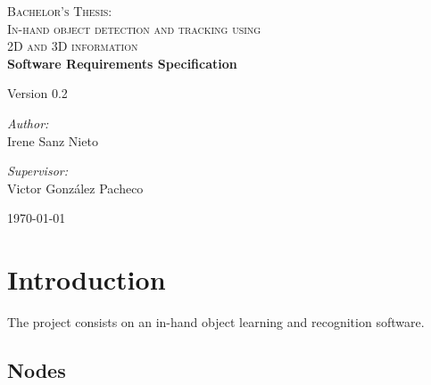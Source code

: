 \documentclass{article}
\begin{document}
\begin{titlepage}

\begin{center}
\textsc{\huge Bachelor's Thesis:\\[0.5cm]In-hand object detection and tracking using\\[0.5cm]2D and 3D
information }\\[4cm]


{\Huge\bfseries{Software Requirements Specification}\\[2cm]}

\Large{Version 0.2}
\\[11cm]


\begin{minipage}{0.55\textwidth}
\begin{flushleft} \large
\emph{Author:}\\
Irene Sanz Nieto\\
\end{flushleft}
\end{minipage}
\begin{minipage}{0.4\textwidth}
\begin{flushright} \large
\emph{Supervisor:}\\
Victor González Pacheco\end{flushright}\end{minipage}\vfill

{\large \today}

\end{center}
\end{titlepage}

%
\newpage
%
\tableofcontents
\newpage


\section{Introduction}
\hspace{0.5cm}The project consists on an in-hand object learning and recognition software. 
\subsection{Nodes}
\end{document}
